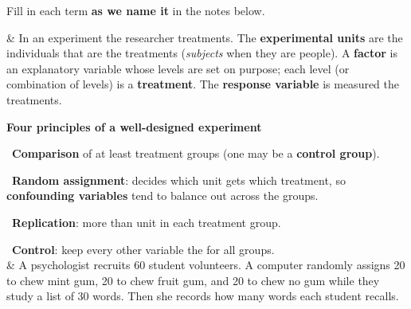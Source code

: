 \documentclass[12pt]{article}
\begin{document}

\vspace{2pt}

\boxguard[16]
\begin{vocabbox}
\small
Fill in each term \textbf{as we name it} in the notes below.
\par
{}
\par
{}
\par
{}
\par
{}
\par
\end{vocabbox}

\small
\begin{guidednotes}
 &
In an experiment the researcher \blank{1.2cm} treatments. The \textbf{experimental units} are
the individuals that are \blank{1.8cm} the treatments (\emph{subjects} when they are people).
A \textbf{factor} is an explanatory variable whose levels are set on purpose; each level (or
combination of levels) is a \textbf{treatment}. The \textbf{response variable} is measured
\blank{1.2cm} the treatments.
\par\vspace{4pt}
\textbf{Four principles of a well-designed experiment}\par\vspace{2pt}
\ \textbf{Comparison} of at least \blank{1.0cm} treatment groups (one may be a
\textbf{control group}).\par
{}\ \textbf{Random assignment}: \blank{1.4cm} decides which unit gets which treatment,
so \textbf{confounding variables} tend to balance out across the groups.\par
{}\ \textbf{Replication}: more than \blank{1.0cm} unit in each treatment group.\par
{}\ \textbf{Control}: keep every other variable the \blank{1.3cm} for all groups.
\\
& A psychologist recruits 60 student volunteers. A computer randomly assigns 20 to chew mint
gum, 20 to chew fruit gum, and 20 to chew no gum while they study a list of 30 words. Then
she records how many words each student recalls.

\end{guidednotes}
\end{document}
